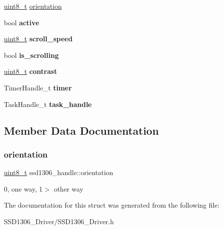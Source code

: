 \begin{DoxyCompactItemize}
\item 
\hyperlink{vl53l0x__types_8h_aba7bc1797add20fe3efdf37ced1182c5}{uint8\+\_\+t} \hyperlink{structssd1306__handle_a335175b6d6dfae547935246bc1ba6fef}{orientation}
\item 
\mbox{\label{structssd1306__handle_a295dcfb0e099238228d3cd4ac4d06444}} 
bool {\bfseries active}
\item 
\mbox{\label{structssd1306__handle_af0ffd518fb6dda992a364a3f8df0831d}} 
\hyperlink{vl53l0x__types_8h_aba7bc1797add20fe3efdf37ced1182c5}{uint8\+\_\+t} {\bfseries scroll\+\_\+speed}
\item 
\mbox{\label{structssd1306__handle_aa3ac863755956825b70806189bd19305}} 
bool {\bfseries is\+\_\+scrolling}
\item 
\mbox{\label{structssd1306__handle_abec5b63e2bbef8942051d3a76b0fd3f5}} 
\hyperlink{vl53l0x__types_8h_aba7bc1797add20fe3efdf37ced1182c5}{uint8\+\_\+t} {\bfseries contrast}
\item 
\mbox{\label{structssd1306__handle_a40bd775f1f513f848e481c40e60e80ac}} 
Timer\+Handle\+\_\+t {\bfseries timer}
\item 
\mbox{\label{structssd1306__handle_a2d44b261112935120dd465248bf85a0b}} 
Task\+Handle\+\_\+t {\bfseries task\+\_\+handle}
\end{DoxyCompactItemize}


\subsection{Member Data Documentation}
\mbox{\label{structssd1306__handle_a335175b6d6dfae547935246bc1ba6fef}} 
\subsubsection{\texorpdfstring{orientation}{orientation}}
{\footnotesize\ttfamily \hyperlink{vl53l0x__types_8h_aba7bc1797add20fe3efdf37ced1182c5}{uint8\+\_\+t} ssd1306\+\_\+handle\+::orientation}

0, one way, 1$>$ other way 

The documentation for this struct was generated from the following file\+:\begin{DoxyCompactItemize}
\item 
S\+S\+D1306\+\_\+\+Driver/S\+S\+D1306\+\_\+\+Driver.\+h\end{DoxyCompactItemize}
